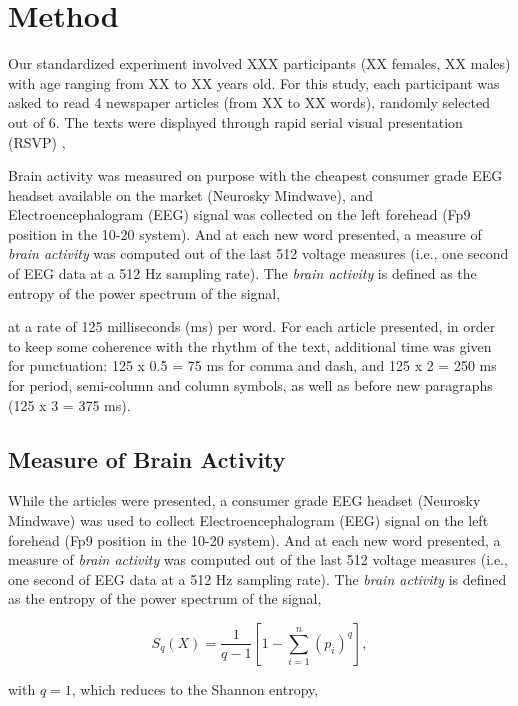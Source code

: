 \section{Method}
Our standardized experiment involved XXX participants (XX females, XX males) with age ranging from XX to XX years old. For this study, each participant was asked to read 4 newspaper articles (from XX to XX words), randomly selected out of 6. The texts were displayed through rapid serial visual presentation (RSVP) \cite{}, 

Brain activity was measured on purpose with the cheapest consumer grade EEG headset available on the market (Neurosky Mindwave), and Electroencephalogram (EEG) signal was collected on the left forehead (Fp9 position in the 10-20 system). And at each new word presented, a measure of {\it brain activity} was computed out of the last 512 voltage measures (i.e., one second of EEG data at a 512 Hz sampling rate). The {\it brain activity} is defined as the entropy of the power spectrum of the signal,






at a rate of 125 milliseconds (ms) per word. For each article presented, in order to keep some coherence with the rhythm of the text\cite{}, additional time was given for punctuation: 125 x 0.5 = 75 ms for comma and dash, and 125 x 2 = 250 ms for period, semi-column and column symbols, as well as before new paragraphs (125 x 3 = 375 ms).\\


\subsection{Measure of Brain Activity}
While the articles were presented, a consumer grade EEG headset (Neurosky Mindwave) was used to collect Electroencephalogram (EEG) signal on the left forehead (Fp9 position in the 10-20 system). And at each new word presented, a measure of {\it brain activity} was computed out of the last 512 voltage measures (i.e., one second of EEG data at a 512 Hz sampling rate). The {\it brain activity} is defined as the entropy of the power spectrum of the signal,

\begin{equation}
\label{eq:tsallis}
S_q(X) = \frac{1}{q-1} \left[ 1 - \sum_{i=1}^n (p_i)^q \right],
\end{equation}

with $q=1$, which reduces to the Shannon entropy,

